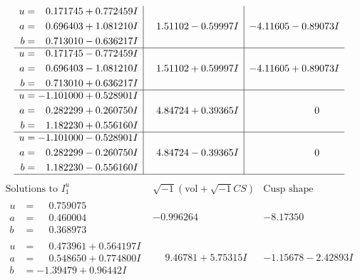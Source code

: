 \documentclass[1p]{elsarticle_modified}
\theoremstyle{definition}
\newcommand{\I}{\sqrt{-1}}
\begin{document}
$$\begin{array}{c|c|c}
\begin{aligned}
u &= \phantom{-}0.171745 + 0.772459 I \\
a &= \phantom{-}0.696403 + 1.081210 I \\
b &= \phantom{-}0.713010 - 0.636217 I\end{aligned}
 & \phantom{-}1.51102 - 0.59997 I & -4.11605 - 0.89073 I \\ \hline\begin{aligned}
u &= \phantom{-}0.171745 - 0.772459 I \\
a &= \phantom{-}0.696403 - 1.081210 I \\
b &= \phantom{-}0.713010 + 0.636217 I\end{aligned}
 & \phantom{-}1.51102 + 0.59997 I & -4.11605 + 0.89073 I \\ \hline\begin{aligned}
u &= -1.101000 + 0.528901 I \\
a &= \phantom{-}0.282299 + 0.260750 I \\
b &= \phantom{-}1.182230 + 0.556160 I\end{aligned}
 & \phantom{-}4.84724 + 0.39365 I & \phantom{-0.000000 } 0 \\ \hline\begin{aligned}
u &= -1.101000 - 0.528901 I \\
a &= \phantom{-}0.282299 - 0.260750 I \\
b &= \phantom{-}1.182230 - 0.556160 I\end{aligned}
 & \phantom{-}4.84724 - 0.39365 I & \phantom{-0.000000 } 0\\
 \hline 
 \end{array}$$\newpage$$\begin{array}{c|c|c}  
\text{Solutions to }I^u_{1}& \I (\text{vol} + \sqrt{-1}CS) & \text{Cusp shape}\\
 \hline 
\begin{aligned}
u &= \phantom{-}0.759075\phantom{ +0.000000I} \\
a &= \phantom{-}0.460004\phantom{ +0.000000I} \\
b &= \phantom{-}0.368973\phantom{ +0.000000I}\end{aligned}
 & -0.996264\phantom{ +0.000000I} & -8.17350\phantom{ +0.000000I} \\ \hline\begin{aligned}
u &= \phantom{-}0.473961 + 0.564197 I \\
a &= \phantom{-}0.548650 + 0.774800 I \\
b &= -1.39479 + 0.96442 I\end{aligned}
 & \phantom{-}9.46781 + 5.75315 I & -1.15678 - 2.42893 I \\ \hline\begin{aligned}

\end{aligned}
\end{array}$$
\end{document}
